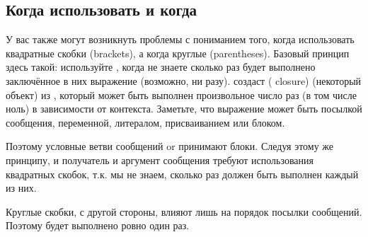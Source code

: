 \documentclass[a4paper,10pt,twoside]{book}
\begin{document}
{%
\subsection{Когда использовать \lct{[ ]} и когда \lct{( )}}
У вас также могут возникнуть проблемы с пониманием того, когда использовать квадратные скобки (brackets), а когда круглые (parentheses).
Базовый принцип здесь такой: используйте \ct{[ ]}, когда не знаете сколько раз будет выполнено заключённое в них выражение (возможно, ни разу).
 создаст  ( closure) (\ie некоторый объект) из , который может быть выполнен произвольное число раз (в том числе ноль) в зависимости от контекста. Заметьте, что выражение может быть посылкой сообщения, переменной, литералом, присваиванием или блоком.

Поэтому условные ветви сообщений  or  принимают блоки. Следуя этому же принципу, и получатель и аргумент сообщения  требуют использования квадратных скобок, т.к. мы не знаем, сколько раз должен быть выполнен каждый из них.

Круглые скобки, с другой стороны, влияют лишь на порядок посылки сообщений.
Поэтому  будет выполнено ровно один раз.

}
\end{document}
